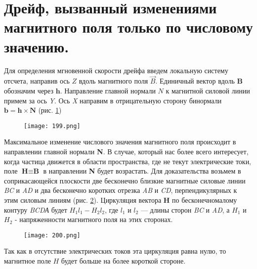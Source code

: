 \section{Дрейф, вызванный изменениями магнитного поля только по числовому значению.}

Для определения мгновенной скорости дрейфа введем локальную систему отсчета, направив ось $Z$ вдоль магнитного поля $\vec{B}$.
Единичный вектор вдоль $\textbf{B}$ обозначим через $\textbf{h}$. 
Направление главной нормали $N$ к магнитной силовой линии примем
за ось \textit{Y}. Ось \textit{X} направим в отрицательную сторону бинормали $\textbf{b}=\textbf{h} \times \textbf{N}$ (рис. \ref{pic199})

\begin{figure}[h!]
    \centering
    \texttt{[image: 199.png]}
    \caption{}
    \label{pic199}
\end{figure}

Максимальное изменение числового значения магнитного поля происходит в направлении главной нормали \textbf{N}. 
В случае, который нас более всего интересует, когда частица движется в области пространства, где не текут электрические токи, поле $\textbf{H} \equiv \textbf{B}$ в направлении \textbf{N} будет возрастать. 
Для доказательства возьмем в соприкасающейся плоскости две бесконечно близкие магнитные силовые линии \textit{BC} и \textit{AD} и два бесконечно коротких отрезка \textit{AB} и \textit{CD}, перпендикулярных к этим силовым линиям (рис. \ref{pic200}). 
Циркуляция вектора \textbf{H} по бесконечномалому контуру \textit{BCDА} будет $H_1 l_1 - H_2 l_2$, где $l_1$ и $l_2$ — длины сторон \textit{BC} и \textit{AD}, а $H_1$ и $H_2$ - напряженности магнитного поля на этих сторонах. 

\begin{figure}[h!]
    \centering
    \texttt{[image: 200.png]}
    \caption{}
    \label{pic200}
\end{figure}

Так как в отсутствие электрических токов эта циркуляция равна нулю, то магнитное поле $H$ будет больше на более короткой стороне. 

